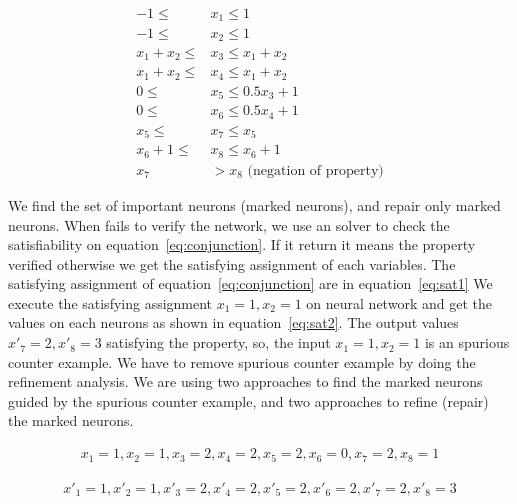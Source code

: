\begin{equation}
    \begin{aligned}
        -1 \leq & x_1 \leq 1 \\ 
        -1 \leq & x_2 \leq 1 \\
         x_1 + x_2 \leq & x_3 \leq x_1 + x_2 \\
         x_1 + x_2 \leq & x_4 \leq x_1 + x_2 \\
         0 \leq & x_5 \leq 0.5x_3+1 \\ 
         0 \leq & x_6 \leq 0.5x_4 + 1 \\
         x_5 \leq & x_7 \leq x_5 \\ 
         x_6+1 \leq & x_8 \leq x_6+1 \\
         x_7 & > x_8 \text{ (negation of property)}
    \end{aligned}
\label{eq:conjunction}
\end{equation}

We find the set of important neurons (marked neurons), and repair only marked neurons. 
When \deeppoly{} fails to verify the network, we use an \milp{} solver to check the satisfiability
on equation~\ref{eq:conjunction}. 
If it return \unsat{} it means the property verified otherwise we get the satisfying assignment of each variables. 
The satisfying assignment of equation~\ref{eq:conjunction} are in equation~\ref{eq:sat1}
We execute the satisfying assignment $x_1=1,x_2=1$ on neural network and get the values on each neurons 
as shown in equation~\ref{eq:sat2}. 
The output values $x'_7=2, x'_8=3$ satisfying the property, so, the input $x_1=1, x_2=1$ is an spurious counter example. 
We have to remove spurious counter example by doing the refinement analysis. 
We are using two approaches to find the marked neurons guided by the spurious counter example, 
and two approaches to refine (repair) the marked neurons.

\begin{equation}
    \begin{aligned}
        x_1=1, x_2=1, x_3=2, x_4=2, x_5=2, x_6=0, x_7=2, x_8=1
    \end{aligned}
\label{eq:sat1}
\end{equation}

\begin{equation}
    \begin{aligned}
        x'_1=1, x'_2=1, x'_3=2, x'_4=2, x'_5=2, x'_6=2, x'_7=2, x'_8=3
    \end{aligned}
\label{eq:sat2}
\end{equation}




